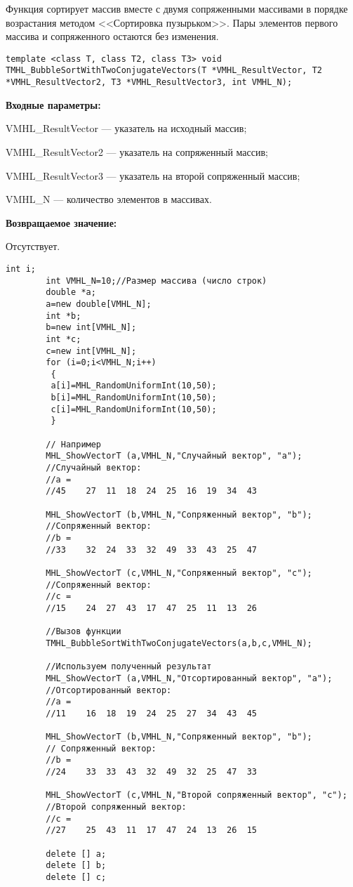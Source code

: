\documentclass[a4paper,12pt]{article}
\begin{document}
Функция сортирует массив вместе с двумя сопряженными массивами в порядке возрастания методом <<Сортировка пузырьком>>. Пары элементов первого массива и сопряженного остаются без изменения.


\begin{lstlisting}[label=code_syntax_TMHL_BubbleSortWithTwoConjugateVectors,caption=Синтаксис]
template <class T, class T2, class T3> void TMHL_BubbleSortWithTwoConjugateVectors(T *VMHL_ResultVector, T2 *VMHL_ResultVector2, T3 *VMHL_ResultVector3, int VMHL_N);
\end{lstlisting}

\textbf{Входные параметры:}
 
VMHL\_ResultVector --- указатель на исходный массив;
 
VMHL\_ResultVector2 --- указатель на сопряженный массив;
 
VMHL\_ResultVector3 --- указатель на второй сопряженный массив;
 
VMHL\_N --- количество элементов в массивах.

\textbf{Возвращаемое значение:}

Отсутствует.


\begin{lstlisting}[label=code_use_TMHL_BubbleSortWithTwoConjugateVectors,caption=Пример использования]
        int i;
        int VMHL_N=10;//Размер массива (число строк)
        double *a;
        a=new double[VMHL_N];
        int *b;
        b=new int[VMHL_N];
        int *c;
        c=new int[VMHL_N];
        for (i=0;i<VMHL_N;i++)
         {
         a[i]=MHL_RandomUniformInt(10,50);
         b[i]=MHL_RandomUniformInt(10,50);
         c[i]=MHL_RandomUniformInt(10,50);
         }

        // Например
        MHL_ShowVectorT (a,VMHL_N,"Случайный вектор", "a");
        //Случайный вектор:
        //a =
        //45	27	11	18	24	25	16	19	34	43

        MHL_ShowVectorT (b,VMHL_N,"Сопряженный вектор", "b");
        //Сопряженный вектор:
        //b =
        //33	32	24	33	32	49	33	43	25	47

        MHL_ShowVectorT (c,VMHL_N,"Сопряженный вектор", "c");
        //Сопряженный вектор:
        //c =
        //15	24	27	43	17	47	25	11	13	26

        //Вызов функции
        TMHL_BubbleSortWithTwoConjugateVectors(a,b,c,VMHL_N);

        //Используем полученный результат
        MHL_ShowVectorT (a,VMHL_N,"Отсортированный вектор", "a");
        //Отсортированный вектор:
        //a =
        //11	16	18	19	24	25	27	34	43	45

        MHL_ShowVectorT (b,VMHL_N,"Сопряженный вектор", "b");
        // Сопряженный вектор:
        //b =
        //24	33	33	43	32	49	32	25	47	33

        MHL_ShowVectorT (c,VMHL_N,"Второй сопряженный вектор", "c");
        //Второй сопряженный вектор:
        //c =
        //27	25	43	11	17	47	24	13	26	15

        delete [] a;
        delete [] b;
        delete [] c;
\end{lstlisting}
\end{document}
